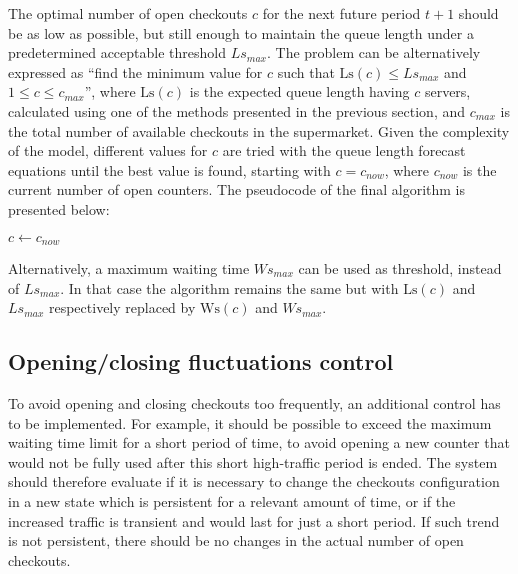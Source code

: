 The optimal number of open checkouts \( c \) for the next future period \( t+1 \) should be as low as possible, but still enough to maintain the queue length under a predetermined acceptable threshold \( Ls_{max} \). The problem can be alternatively expressed as “find the minimum value for \( c \) such that \( \text{Ls}(c) \leq Ls_{max} \) and \( 1 \leq c \leq c_{max} \)”, where \( \text{Ls}(c) \) is the expected queue length having \( c \) servers, calculated using one of the methods presented in the previous section, and \( c_{max} \) is the total number of available checkouts in the supermarket. Given the complexity of the model, different values for \( c \) are tried with the queue length forecast equations until the best value is found, starting with \( c = c_{now} \), where \( c_{now} \) is the current number of open counters. The pseudocode of the final algorithm is presented below:
\begin{algorithm}[H]
  $ c \gets c_{now}$\;
\end{algorithm}

Alternatively, a maximum waiting time \( Ws_{max} \) can be used as threshold, instead of \( Ls_{max} \). In that case the algorithm remains the same but with \( \text{Ls}(c) \) and \( Ls_{max} \) respectively replaced by \( \text{Ws}(c) \) and \( Ws_{max} \).

\subsection{Opening/closing fluctuations control}
\label{subsec:opening_closing_fluctuations_control}

To avoid opening and closing checkouts too frequently, an additional control has to be implemented. For example, it should be possible to exceed the maximum waiting time limit for a short period of time, to avoid opening a new counter that would not be fully used after this short high-traffic period is ended. The system should therefore evaluate if it is necessary to change the checkouts configuration in a new state which is persistent for a relevant amount of time, or if the increased traffic is transient and would last for just a short period. If such trend is not persistent, there should be no changes in the actual number of open checkouts.

